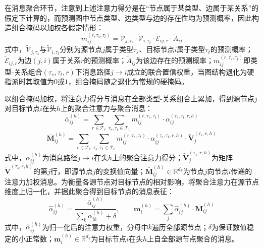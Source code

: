 在消息聚合环节，注意到上述注意力得分是在``节点属于某类型、边属于某关系''的假定下计算的，而预测图中节点类型、边类型与边的存在性均为预测概率，因此构造组合掩码以加权各假定情形：
\begin{equation}
  m_{ij}^{(r, \tau_s, \tau_t)} = \tilde{\mathcal{V}}_{j, \tau_s} \cdot \tilde{\mathcal{V}}_{i, \tau_t} \cdot \tilde{\mathcal{E}}_{ij, r} \cdot \tilde{A}_{ij}
  \label{eq.popsyn.hgtmask}
\end{equation}
式中，$\tilde{\mathcal{V}}_{j, \tau_s}$与$\tilde{\mathcal{V}}_{i, \tau_t}$分别为源节点$j$属于类型$\tau_s$、目标节点$i$属于类型$\tau_t$的预测概率；$\tilde{\mathcal{E}}_{ij, r}$为边$(j, i)$属于关系$r$的预测概率；$\tilde{A}_{ij}$为该边存在的预测概率；$m_{ij}^{(r, \tau_s, \tau_t)}$即类型-关系组合$(\tau_s, \tau_t, r)$下消息路径$j \to i$成立的联合置信权重，当图结构退化为硬指派时其取值为$0$或$1$，组合掩码随之退化为常规的硬掩码。
 
以组合掩码加权，将注意力得分与消息在全部类型-关系组合上累加，得到源节点$j$对目标节点$i$在头$h$上的聚合注意力与聚合消息：
\begin{equation}
  \bar{\alpha}_{ij}^{(h)} = \sum_{r \in \mathcal{T}_e} \sum_{\tau_s, \tau_t \in \mathcal{T}_v} m_{ij}^{(r, \tau_s, \tau_t)} \cdot \alpha_{ij}^{(\tau_s, \tau_t, r, h)}
  \label{eq.popsyn.hgtaggatt}
\end{equation}
\begin{equation}
  \bar{\mathbf{M}}_{ij}^{(h)} = \sum_{r \in \mathcal{T}_e} \sum_{\tau_s, \tau_t \in \mathcal{T}_v} m_{ij}^{(r, \tau_s, \tau_t)} \cdot \alpha_{ij}^{(\tau_s, \tau_t, r, h)} \cdot \tilde{\mathbf{V}}_j^{(\tau_s, r, h)}
  \label{eq.popsyn.hgtaggmsg}
\end{equation}
式中，$\bar{\alpha}_{ij}^{(h)}$为消息路径$j \to i$在头$h$上的聚合注意力得分；$\tilde{\mathbf{V}}_j^{(\tau_s, r, h)}$为矩阵$\tilde{\mathbf{V}}^{(\tau_s, r, h)}$的第$j$行，即源节点$j$的变换值向量；$\bar{\mathbf{M}}_{ij}^{(h)} \in \mathbb{R}^{d_k}$为节点$j$向节点$i$传递的注意力加权消息。为衡量各源节点对目标节点的相对影响，将聚合注意力在源节点维度上归一化，并据此聚合得到目标节点的消息表征：
\begin{equation}
  \hat{\alpha}_{ij}^{(h)} = \frac{\bar{\alpha}_{ij}^{(h)}}{\sum_{k} \bar{\alpha}_{ik}^{(h)} + \delta}, \qquad
  \mathbf{m}_i^{(h)} = \sum_{j} \hat{\alpha}_{ij}^{(h)} \cdot \bar{\mathbf{M}}_{ij}^{(h)}
  \label{eq.popsyn.hgtnorm}
\end{equation}
式中，$\hat{\alpha}_{ij}^{(h)}$为归一化后的注意力权重，分母中$k$遍历全部源节点；$\delta$为保证数值稳定的小正常数；$\mathbf{m}_i^{(h)} \in \mathbb{R}^{d_k}$为目标节点$i$在头$h$上自全部源节点聚合的消息。
 
